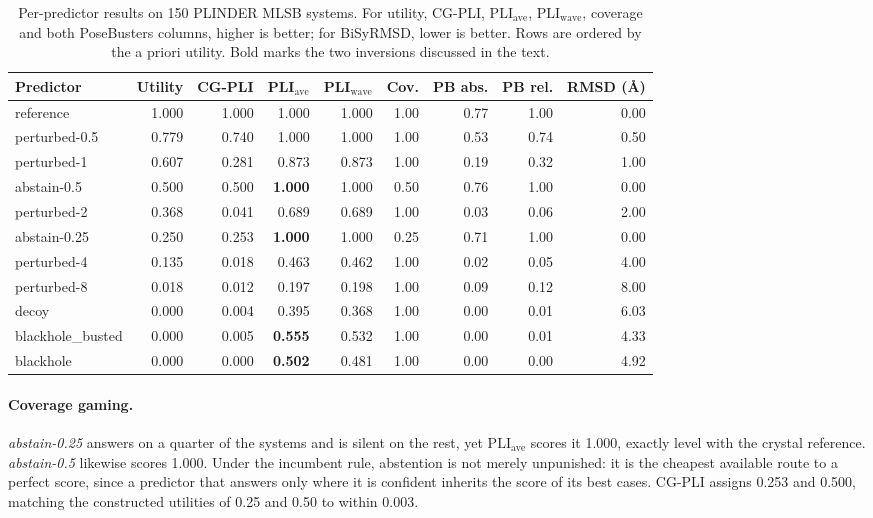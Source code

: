 \documentclass{article} %
\begin{document}
\begin{table}[t]
\centering
\small
\caption{Per-predictor results on 150 PLINDER MLSB systems. For utility, CG-PLI,
$\mathrm{PLI}_{\text{ave}}$, $\mathrm{PLI}_{\text{wave}}$, coverage and both PoseBusters
columns, higher is better; for BiSyRMSD, lower is better. Rows are ordered by the a
priori utility. Bold marks the two inversions discussed in the text.}
\label{tab:main}
\begin{tabular}{lrrrrrrrr}
\toprule
Predictor & Utility & CG-PLI & PLI$_{\text{ave}}$ & PLI$_{\text{wave}}$ & Cov. & PB abs. & PB rel. & RMSD (\AA{}) \\
\midrule
reference          & 1.000 & 1.000 & 1.000 & 1.000 & 1.00 & 0.77 & 1.00 & 0.00 \\
perturbed-0.5      & 0.779 & 0.740 & 1.000 & 1.000 & 1.00 & 0.53 & 0.74 & 0.50 \\
perturbed-1        & 0.607 & 0.281 & 0.873 & 0.873 & 1.00 & 0.19 & 0.32 & 1.00 \\
abstain-0.5        & 0.500 & 0.500 & \textbf{1.000} & 1.000 & 0.50 & 0.76 & 1.00 & 0.00 \\
perturbed-2        & 0.368 & 0.041 & 0.689 & 0.689 & 1.00 & 0.03 & 0.06 & 2.00 \\
abstain-0.25       & 0.250 & 0.253 & \textbf{1.000} & 1.000 & 0.25 & 0.71 & 1.00 & 0.00 \\
perturbed-4        & 0.135 & 0.018 & 0.463 & 0.462 & 1.00 & 0.02 & 0.05 & 4.00 \\
perturbed-8        & 0.018 & 0.012 & 0.197 & 0.198 & 1.00 & 0.09 & 0.12 & 8.00 \\
decoy              & 0.000 & 0.004 & 0.395 & 0.368 & 1.00 & 0.00 & 0.01 & 6.03 \\
blackhole\_busted  & 0.000 & 0.005 & \textbf{0.555} & 0.532 & 1.00 & 0.00 & 0.01 & 4.33 \\
blackhole          & 0.000 & 0.000 & \textbf{0.502} & 0.481 & 1.00 & 0.00 & 0.00 & 4.92 \\
\bottomrule
\end{tabular}
\end{table}

\paragraph{Coverage gaming.} \emph{abstain-0.25} answers on a quarter of the systems and
is silent on the rest, yet $\mathrm{PLI}_{\text{ave}}$ scores it 1.000, exactly level
with the crystal reference. \emph{abstain-0.5} likewise scores 1.000. Under the incumbent
rule, abstention is not merely unpunished: it is the cheapest available route to a
perfect score, since a predictor that answers only where it is confident inherits the
score of its best cases. CG-PLI assigns 0.253 and 0.500, matching the constructed
utilities of 0.25 and 0.50 to within 0.003.
\end{document}
